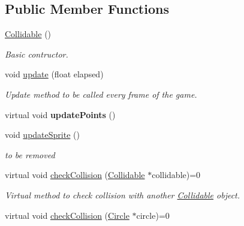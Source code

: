 \subsection*{Public Member Functions}
\begin{DoxyCompactItemize}
\item 
\hypertarget{class_collidable_a92ce9e2b08086bb2f466168ffc69c9ed}{}\hyperlink{class_collidable_a92ce9e2b08086bb2f466168ffc69c9ed}{Collidable} ()\label{class_collidable_a92ce9e2b08086bb2f466168ffc69c9ed}

\begin{DoxyCompactList}\small\item\em Basic contructor. \end{DoxyCompactList}\item 
\hypertarget{class_collidable_ad636cf1a7fab85fb2dfedf08c02c7745}{}void \hyperlink{class_collidable_ad636cf1a7fab85fb2dfedf08c02c7745}{update} (float elapsed)\label{class_collidable_ad636cf1a7fab85fb2dfedf08c02c7745}

\begin{DoxyCompactList}\small\item\em Update method to be called every frame of the game. \end{DoxyCompactList}\item 
\hypertarget{class_collidable_abeb14a34d7c7dc47b0c3c51a25a44e64}{}virtual void {\bfseries update\+Points} ()\label{class_collidable_abeb14a34d7c7dc47b0c3c51a25a44e64}

\item 
void \hyperlink{class_collidable_a656ce92dd3e3f1b1981eb79c97ed3115}{update\+Sprite} ()
\begin{DoxyCompactList}\small\item\em to be removed \end{DoxyCompactList}\item 
\hypertarget{class_collidable_a25c916c15277425a1b2606d35c7405fe}{}virtual void \hyperlink{class_collidable_a25c916c15277425a1b2606d35c7405fe}{check\+Collision} (\hyperlink{class_collidable}{Collidable} $\ast$collidable)=0\label{class_collidable_a25c916c15277425a1b2606d35c7405fe}

\begin{DoxyCompactList}\small\item\em Virtual method to check collision with another \hyperlink{class_collidable}{Collidable} object. \end{DoxyCompactList}\item 
\hypertarget{class_collidable_a157281cb33cb695c8eb0c8dd971b84f2}{}virtual void \hyperlink{class_collidable_a157281cb33cb695c8eb0c8dd971b84f2}{check\+Collision} (\hyperlink{class_circle}{Circle} $\ast$circle)=0\label{class_collidable_a157281cb33cb695c8eb0c8dd971b84f2}


\end{DoxyCompactItemize}
